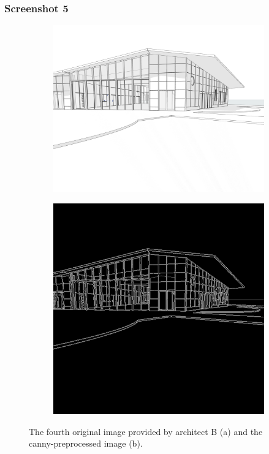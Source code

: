 \subsubsection{Screenshot 5}
\begin{figure}[H]
    \centering
    \begin{subfigure}[b]{0.3\textwidth}
        \centering
        \includegraphics[width=\textwidth]{Images/Results/Architect-B_unstructured-phase/screenshots/screenshot_5.png}
        \caption{}
        \label{fig:B-screenshot-5-a}
    \end{subfigure}
    \begin{subfigure}[b]{0.3\textwidth}
        \centering 
        \includegraphics[width=\textwidth]{Images/Results/Architect-B_unstructured-phase/screenshots/screenshot_5_preprocessed.png}
        \caption{}
        \label{fig:B-screenshot-5-prep}
    \end{subfigure}
    \caption{The fourth original image provided by architect B (a) and the canny-preprocessed image (b).}
    \label{fig:B-screenshot-5}
\end{figure}

